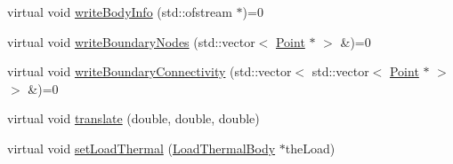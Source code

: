 \begin{DoxyCompactItemize}
\item 
virtual void \hyperlink{classmknix_1_1_body_a25c23173ef74c5ef821f6850bc1d8861}{write\+Body\+Info} (std\+::ofstream $\ast$)=0
\item 
virtual void \hyperlink{classmknix_1_1_body_ac1b5b8a41f713a7d569598e43f9cde61}{write\+Boundary\+Nodes} (std\+::vector$<$ \hyperlink{classmknix_1_1_point}{Point} $\ast$ $>$ \&)=0
\item 
virtual void \hyperlink{classmknix_1_1_body_addb14e7d7db378199a0ece0707611129}{write\+Boundary\+Connectivity} (std\+::vector$<$ std\+::vector$<$ \hyperlink{classmknix_1_1_point}{Point} $\ast$ $>$ $>$ \&)=0
\item 
virtual void \hyperlink{classmknix_1_1_body_a5f58f8e5398bbacc973b046be600eb5f}{translate} (double, double, double)
\item 
virtual void \hyperlink{classmknix_1_1_body_a95a6a5e78013a9ca160842915f3a4703}{set\+Load\+Thermal} (\hyperlink{classmknix_1_1_load_thermal_body}{Load\+Thermal\+Body} $\ast$the\+Load)
\end{DoxyCompactItemize}
